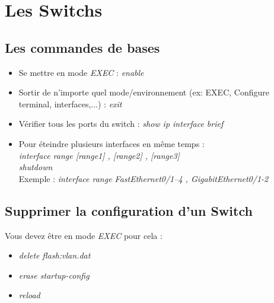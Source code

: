 \documentclass[a4paper]{article}
\begin{document}
\newpage
\section{Les Switchs}

\subsection{Les commandes de bases}
\begin{itemize}
  \item Se mettre en mode \emph{EXEC} : \emph{enable}
  \item Sortir de n'importe quel mode/environnement (ex: EXEC, Configure terminal, interfaces,...) : \emph{exit}
  \item Vérifier tous les ports du switch : \emph{show ip interface brief}
  \item Pour éteindre plusieurs interfaces en même temps : \\
  \emph{interface range [range1] , [range2] , [range3]}\\
  \emph{shutdown}\\
  Exemple :\emph{ interface range FastEthernet0/1–4 , GigabitEthernet0/1-2}
  
\end{itemize}

\subsection{Supprimer la configuration d'un Switch}
Vous devez être en mode \emph{EXEC} pour cela :
\begin{itemize}
  \item \emph{delete {\NoAutoSpacing flash:vlan.dat}}
  \item \emph{erase startup-config}
  \item \emph{reload}
\end{itemize}
\end{document}

